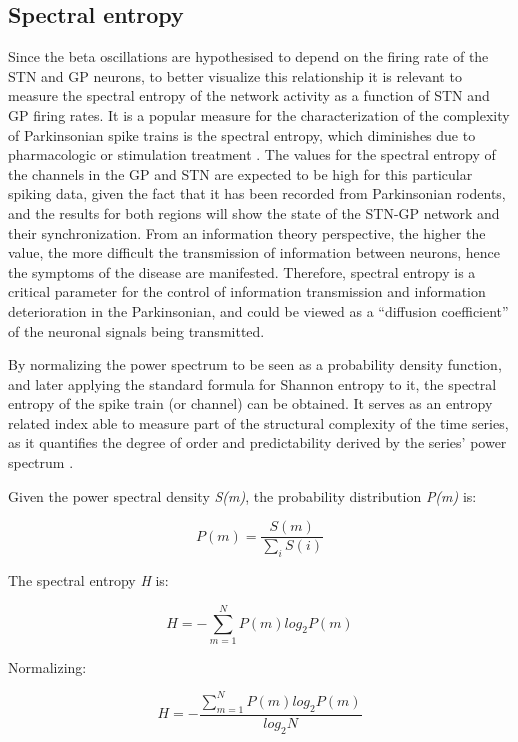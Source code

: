 \documentclass{article}
\begin{document}
\subsection{Spectral entropy}

Since the beta oscillations are hypothesised to depend on the firing rate of the STN and GP neurons, to better visualize this relationship it is relevant to measure the spectral entropy of the network activity as a function of STN and GP firing rates. 
It is a popular measure for the characterization of the complexity of Parkinsonian spike trains is the spectral entropy, which diminishes due to pharmacologic or stimulation treatment \citep{Andres}. 
The values for the spectral entropy of the channels in the GP and STN are expected to be high for this particular spiking data, given the fact that it has been recorded from Parkinsonian rodents, and the results for both regions will show the state of the STN-GP network and their synchronization. From an information theory perspective, the higher the value, the more difficult the transmission of information between neurons, hence the symptoms of the disease are manifested. Therefore, spectral entropy is a critical parameter for the control of information transmission and information deterioration in the Parkinsonian, and could be viewed as a “diffusion coefficient” of the neuronal signals being transmitted.

By normalizing the power spectrum to be seen as a probability density function, and later applying the standard formula for Shannon entropy to it, the spectral entropy of the spike train (or channel) can be obtained. 
It serves as an entropy related index able to measure part of the structural complexity of the time series, as it quantifies the degree of order and predictability derived by the series' power spectrum \citep{Zacca}.

Given the power spectral density \textit{S(m)}, the probability distribution \textit{P(m)} is:

\begin{equation}
P(m) = \frac{S(m)}{\sum_i S(i)}
\end{equation}

The spectral entropy \textit{H} is:

\begin{equation}
H = -\sum_{m=1}^N P(m) log_2 P(m)
\end{equation}

Normalizing:

\begin{equation}
H = -\frac{\sum_{m=1}^N P(m) log_2 P(m)}{log_2 N}
\end{equation}
\end{document}
